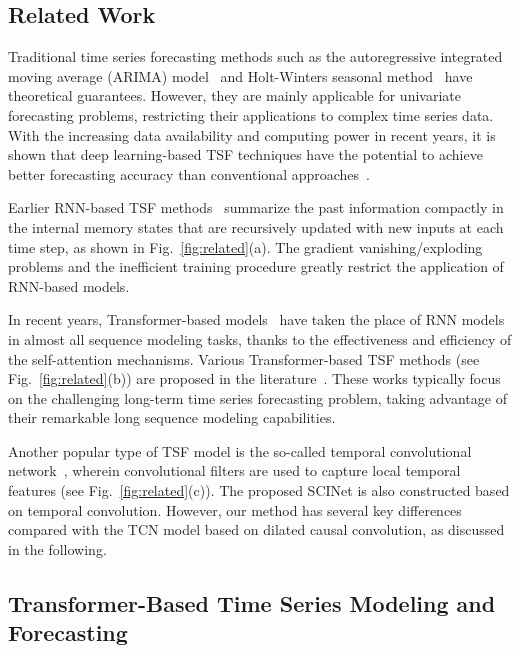 \documentclass{article}
\begin{document}
\subsection{Related Work}

Traditional time series forecasting methods such as the autoregressive integrated moving average (ARIMA) model~\citep{Box1968SomeRA} and Holt-Winters seasonal method~\citep{Holt2004ForecastingSA} have theoretical guarantees. However, they are mainly applicable for univariate forecasting problems, restricting their applications to complex time series data. With the increasing data availability and computing power in recent years, it is shown that deep learning-based TSF techniques have the potential to achieve better forecasting accuracy than conventional approaches~\citep{Lim2021TimeseriesFW,Oreshkin2020NBeats}. 

Earlier RNN-based TSF methods~\citep{rangapuram2018deep,salinas2020deepar} summarize the past information compactly in the internal memory states that are recursively updated with new inputs at each time step, as shown in Fig.~\ref{fig:related}(a). 
The gradient vanishing/exploding problems and the inefficient training procedure greatly restrict the application of RNN-based models. 

In recent years, Transformer-based models~\citep{vaswani2017attention} have taken the place of RNN models in almost all sequence modeling tasks, thanks to the effectiveness and efficiency of the self-attention mechanisms. Various Transformer-based TSF methods (see Fig.~\ref{fig:related}(b)) are proposed in the literature~\citep{li2019enhancing,lim2021temporal,Wu2021AutoformerDT,Liu2022Pyraformer}. These works typically focus on the challenging long-term time series forecasting problem, taking advantage of their remarkable long sequence modeling capabilities.


Another popular type of TSF model is the so-called temporal convolutional network~\cite{borovykh2017conditional,Bai2018AnEE,Sen2019ThinkGA, Wu2019GraphWF,nguyen2021temporal}, wherein convolutional filters are used to capture local temporal features (see Fig.~\ref{fig:related}(c)). The proposed SCINet is also constructed based on temporal convolution. However, our method has several key differences compared with the TCN model based on dilated causal convolution, as discussed in the following.







\iffalse
\subsection{Transformer-Based Time Series Modeling and Forecasting}
\label{sec:rethinking_transformer}
\end{document}
